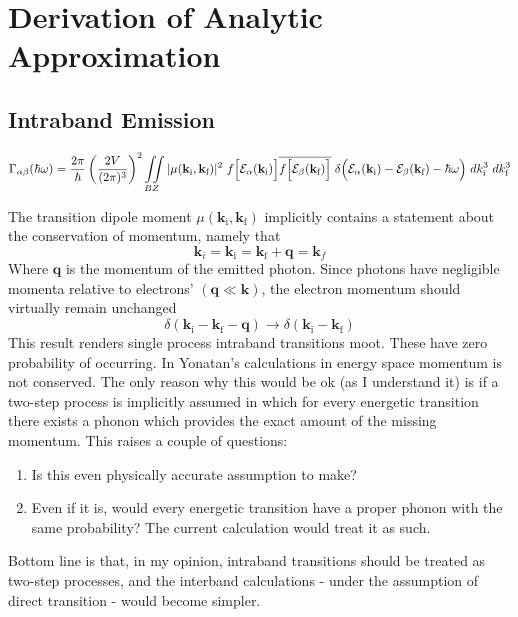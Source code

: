 \newpage
\section{Derivation of Analytic Approximation}
\label{app:derivation_analytic_approximation}

\subsection{Intraband Emission}
\begin{equation}
\small
\Gamma_{\alpha\beta}(\hbar\omega) = \frac{2\pi}{\hbar}\left( \frac{2V}{(2\pi)^{3}} \right)^{2} \iint\limits_{BZ} |\mu(\mathbf{k}_{\text{i}},\mathbf{k}_{\text{f}})|^{2} \  f\Big[\mathcal{E_{\alpha}}(\mathbf{k}_{\text{i}})  \Big]\overline{f\Big[\mathcal{E_{\beta}}(\mathbf{k}_{\text{f}})  \Big]}\  \delta\Big(\mathcal{E}_{\alpha}(\mathbf{k}_{\text{i}}) - \mathcal{E}_{\beta}(\mathbf{k}_{\text{f}}) - \hbar\omega   \Big) \  dk_{\text{i}}^{3} \ dk_{\text{f}}^{3}
\label{eq:gamma_ab_general}
\end{equation}
\normalsize
\begin{tcolorbox}[title={Note: Impossibility of a one step intraband transition}]
The transition dipole moment $\mu(\mathbf{k}_{\text{i}},\mathbf{k}_{\text{f}})$ implicitly contains a statement about the conservation of momentum, namely that
\begin{equation}
\mathbf{k}_{i} = \mathbf{k}_{\text{i}} = \mathbf{k}_{\text{f}}+\mathbf{q} = \mathbf{k}_{f}
\label{eq:momentum_conservation_statement}
\end{equation}
Where $\mathbf{q}$ is the momentum of the emitted photon. Since photons have negligible momenta relative to electrons' $(\mathbf{q}\ll \mathbf{k})$, the electron momentum should virtually remain unchanged
\begin{equation}
\delta(\mathbf{k}_{\text{i}} - \mathbf{k}_{\text{f}}-\mathbf{q}) \to \delta(\mathbf{k}_{\text{i}} - \mathbf{k}_{\text{f}})
\label{eq:momentum_conservation_delta}
\end{equation}
This result renders single process intraband transitions moot. These have zero probability of occurring. In Yonatan's calculations in energy space momentum is not conserved. The only reason why this would be ok (as I understand it) is if a two-step process is implicitly assumed in which for every energetic transition there exists a phonon which provides the exact amount of the missing momentum. This raises a couple of questions:
\begin{enumerate}
  \item Is this even physically accurate assumption to make?
  \item Even if it is, would every energetic transition have a proper phonon with the same probability? The current calculation would treat it as such.
\end{enumerate}

Bottom line is that, in my opinion, intraband transitions should be treated as two-step processes, and the interband calculations - under the assumption of direct transition - would become simpler.
\end{tcolorbox}

